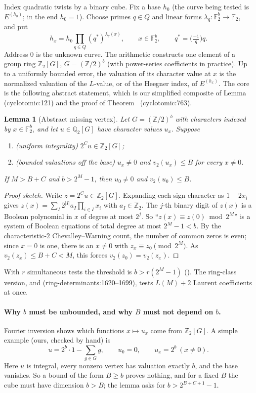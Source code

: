 \documentclass[11pt]{article}
\newtheorem{lemma}{Lemma}
\theoremstyle{remark}
\newcommand{\Q}{\mathbb Q}
\newcommand{\Z}{\mathbb Z}
\newcommand{\F}{\mathbb F}
\newcommand{\src}[2]{\textsf{\small #1:#2}}
\begin{document}
Index quadratic twists by a binary cube. Fix a base $h_0$ (the curve being
tested is $E^{(h_0)}$; in the end $h_0=1$). Choose primes $q\in Q$ and
linear forms $\lambda_q:\F_2^b\to\F_2$, and put
\[
 h_x=h_0\prod_{q\in Q}(q^*)^{\lambda_q(x)},\qquad x\in\F_2^b,\qquad
 q^*=\bigl(\tfrac{-1}{q}\bigr)q .
\]
Address $0$ is the unknown curve. The arithmetic constructs one element of a
group ring $\Z_2[G]$, $G=(\Z/2)^b$ (with power-series coefficients in
practice). Up to a uniformly bounded error, the valuation of its character
value at $x$ is the normalized valuation of the $L$-value, or of the Heegner
index, of $E^{(h_x)}$. The core is the following abstract
statement, which is our simplified composite of Lemma~
(\src{cyclotomic}{121}) and the proof of Theorem~
(\src{cyclotomic}{763}).

\begin{lemma}[Abstract missing vertex]\label{lem:A}
Let $G=(\Z/2)^b$ with characters indexed by $x\in\F_2^b$, and let
$u\in\Q_2[G]$ have character values $u_x$. Suppose
\begin{enumerate}
\item \emph{(uniform integrality)} $2^{C}u\in\Z_2[G]$;
\item \emph{(bounded valuations off the base)} $u_x\ne0$ and $v_2(u_x)\le B$
 for every $x\ne0$.
\end{enumerate}
If $M>B+C$ and $b>2^M-1$, then $u_0\ne0$ and $v_2(u_0)\le B$.
\end{lemma}

\begin{proof}[Proof sketch]
Write $z=2^Cu\in\Z_2[G]$. Expanding each sign character as $1-2x_i$ gives
$z(x)=\sum_I 2^{|I|}a_I\prod_{i\in I}x_i$ with $a_I\in\Z_2$. The $j$-th
binary digit of $z(x)$ is a Boolean polynomial in $x$ of degree at most
$2^j$. So ``$z(x)\equiv z(0)\bmod 2^M$'' is a system of Boolean equations of
total degree at most $2^M-1<b$. By the characteristic-$2$
Chevalley--Warning count, the number of common zeros is even; since $x=0$ is
one, there is an $x\ne0$ with $z_x\equiv z_0\pmod{2^M}$. As
$v_2(z_x)\le B+C<M$, this forces $v_2(z_0)=v_2(z_x)$.
\end{proof}

With $r$ simultaneous tests the threshold is $b>r(2^M-1)$
(). The ring-class version,  and
 (\src{ring-determinants}{1620--1699}), tests
$L(M)+2$ Laurent coefficients at once.

\paragraph{Why $b$ must be unbounded, and why $B$ must not depend on $b$.}
Fourier inversion shows which functions $x\mapsto u_x$ come from
$\Z_2[G]$. A simple example (ours, checked by hand) is
\[
 u=2^b\cdot1-\sum_{g\in G}g,\qquad u_0=0,\qquad u_x=2^b\ (x\ne0).
\]
Here $u$ is integral, every nonzero vertex has valuation exactly $b$, and
the base vanishes. So a bound of the form $B\ge b$ proves nothing, and for a
fixed $B$ the cube must have dimension $b>B$; the lemma asks for
$b>2^{B+C+1}-1$.
\end{document}
